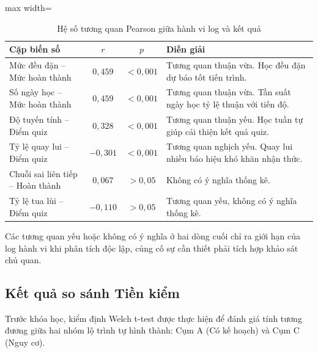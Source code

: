 \begin{table}[H]
\centering
\caption{Hệ số tương quan Pearson giữa hành vi log và kết quả}
\label{tab:tuong_quan_pearson}
\begin{adjustbox}{max width=\textwidth}
\begin{tabular}{lccp{5.5cm}}
\toprule
\textbf{Cặp biến số} & \textbf{$r$} & \textbf{$p$} & \textbf{Diễn giải} \\
\midrule
Mức đều đặn -- Mức hoàn thành & $0,459$ & $< 0,001$ & Tương quan thuận vừa. Học đều đặn dự báo tốt tiến trình. \\
Số ngày học -- Mức hoàn thành & $0,459$ & $< 0,001$ & Tương quan thuận vừa. Tần suất ngày học tỷ lệ thuận với tiến độ. \\
Độ tuyến tính -- Điểm quiz & $0,328$ & $< 0,001$ & Tương quan thuận yếu. Học tuần tự giúp cải thiện kết quả quiz. \\
Tỷ lệ quay lui -- Điểm quiz & $-0,301$ & $< 0,001$ & Tương quan nghịch yếu. Quay lui nhiều báo hiệu khó khăn nhận thức. \\
Chuỗi sai liên tiếp -- Hoàn thành & $0,067$ & $> 0,05$ & Không có ý nghĩa thống kê. \\
Tỷ lệ tua lùi -- Điểm quiz & $-0,110$ & $> 0,05$ & Tương quan yếu, không có ý nghĩa thống kê. \\
\bottomrule
\end{tabular}
\end{adjustbox}
\end{table}

Các tương quan yếu hoặc không có ý nghĩa ở hai dòng cuối chỉ ra giới hạn của log hành vi khi phân tích độc lập, củng cố sự cần thiết phải tích hợp khảo sát chủ quan.

\subsection{Kết quả so sánh Tiền kiểm}

Trước khóa học, kiểm định Welch t-test được thực hiện để đánh giá tính tương đương giữa hai nhóm lộ trình tự hình thành: Cụm A (Có kế hoạch) và Cụm C (Nguy cơ).

